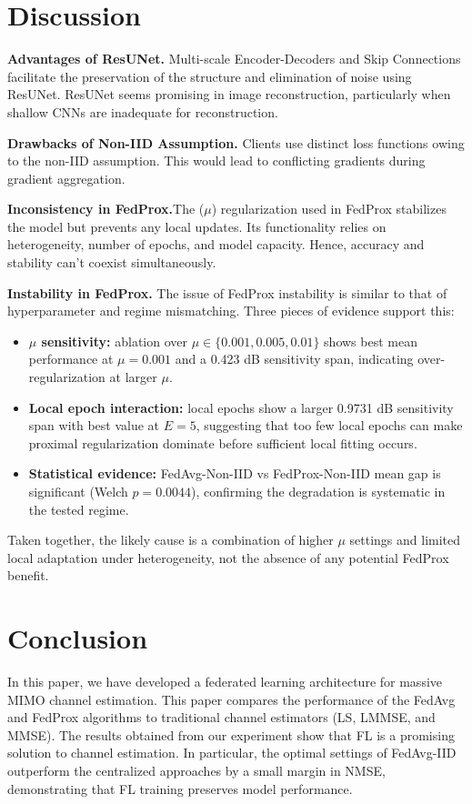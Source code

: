 \documentclass{llncs}
\begin{document}
\section{Discussion}

\textbf{Advantages of ResUNet.} Multi-scale Encoder-Decoders and Skip Connections facilitate the preservation of the structure and elimination of noise using ResUNet. ResUNet seems promising in image reconstruction, particularly when shallow CNNs are inadequate for reconstruction.

\textbf{Drawbacks of Non-IID Assumption.} Clients use distinct loss functions owing to the non-IID assumption. This would lead to conflicting gradients during gradient aggregation.

\textbf{Inconsistency in FedProx.}The ($\mu$) regularization  used in FedProx stabilizes the model but prevents any local updates. Its functionality relies on heterogeneity, number of epochs, and model capacity. Hence, accuracy and stability can’t coexist simultaneously.

\textbf{Instability in FedProx.} The issue of FedProx instability is similar to that of hyperparameter and regime mismatching. Three pieces of evidence support this:
\begin{itemize}
    \item \textbf{$\mu$ sensitivity:} ablation over $\mu\in\{0.001,0.005,0.01\}$ shows best mean performance at $\mu=0.001$ and a 0.423 dB sensitivity span, indicating over-regularization at larger $\mu$.
    \item \textbf{Local epoch interaction:} local epochs show a larger 0.9731 dB sensitivity span with best value at $E=5$, suggesting that too few local epochs can make proximal regularization dominate before sufficient local fitting occurs.
    \item \textbf{Statistical evidence:} FedAvg-Non-IID vs FedProx-Non-IID mean gap is significant (Welch $p=0.0044$), confirming the degradation is systematic in the tested regime.
\end{itemize}



Taken together, the likely cause is a combination of higher $\mu$ settings and limited local adaptation under heterogeneity, not the absence of any potential FedProx benefit.



\section{Conclusion}
In this paper, we have developed a federated learning architecture for massive MIMO channel estimation. This paper compares the performance of the FedAvg and FedProx algorithms to traditional channel estimators (LS, LMMSE, and MMSE). The results obtained from our experiment show that FL is a promising solution to channel estimation. In particular, the optimal settings of FedAvg-IID outperform the centralized approaches by a small margin in NMSE, demonstrating that FL training preserves model performance.
\end{document}
